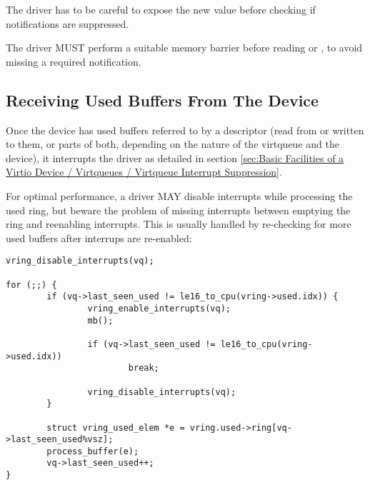 The driver has to be careful to expose the new 
value before checking if notifications are suppressed.

The driver MUST perform a suitable memory barrier before reading  or
, to avoid missing a required notification.

\subsection{Receiving Used Buffers From The Device}\label{sec:General Initialization And Device Operation / Device Operation / Receiving Used Buffers From The Device}

Once the device has used buffers referred to by a descriptor (read from or written to them, or
parts of both, depending on the nature of the virtqueue and the
device), it interrupts the driver as detailed in section \ref{sec:Basic Facilities of a Virtio Device / Virtqueues / Virtqueue Interrupt Suppression}.

\begin{note}
For optimal performance, a driver MAY disable interrupts while processing
the used ring, but beware the problem of missing interrupts between
emptying the ring and reenabling interrupts.  This is usually handled by
re-checking for more used buffers after interrups are re-enabled:

\begin{lstlisting}
vring_disable_interrupts(vq);

for (;;) {
        if (vq->last_seen_used != le16_to_cpu(vring->used.idx)) {
                vring_enable_interrupts(vq);
                mb();

                if (vq->last_seen_used != le16_to_cpu(vring->used.idx))
                        break;

                vring_disable_interrupts(vq);
        }

        struct vring_used_elem *e = vring.used->ring[vq->last_seen_used%vsz];
        process_buffer(e);
        vq->last_seen_used++;
}
\end{lstlisting}
\end{note}

